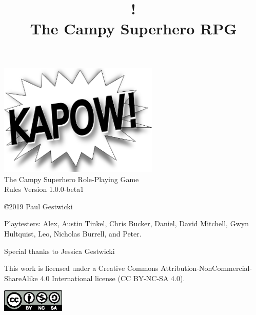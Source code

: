 \documentclass[letterpaper]{report}
\title{\kapow{}!\\The Campy Superhero RPG}
\begin{document}
\vspace*{\fill}
\thispagestyle{empty}
\begin{centering}
  \includegraphics[width=3in]{logo}\\
  {\Huge The Campy Superhero Role-Playing Game}\\
  \vspace{1in}
  {\large Rules Version 1.0.0-beta1}\\
\end{centering}
\vspace*{\fill}


\newpage
\thispagestyle{empty}
\vspace*{\fill}

\noindent \copyright 2019 Paul Gestwicki
\vspace{0.5cm}

\noindent Playtesters:
Alex,
Austin Tinkel,
Chris Bucker,
Daniel,
David Mitchell,
Gwyn Hultquist,
Leo,
Nicholas Burrell,
and 
Peter.

\vspace{0.5cm}

\noindent Special thanks to Jessica Gestwicki


\vspace{0.5cm}

\noindent
This work is licensed under a Creative Commons Attribution-NonCommercial-ShareAlike 4.0 International license (CC BY-NC-SA 4.0).\\

\begin{centering}
  \includegraphics[width=3cm]{by-nc-sa}\\
\end{centering}

\newpage
{}
\end{document}
